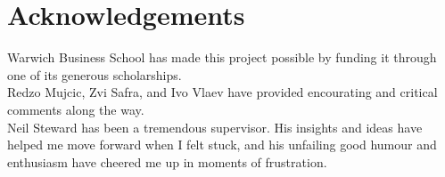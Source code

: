 
\chapter*{Acknowledgements}%
\label{cha:acknowledgements}

Warwich Business School has made this project possible by funding it through one of its generous scholarships.\\

\noindent Redzo Mujcic, Zvi Safra, and Ivo Vlaev have provided encourating and critical comments along the way.\\

\noindent Neil Steward has been a tremendous supervisor. His insights and ideas have
helped me move forward when I felt stuck, and his unfailing good humour and
enthusiasm have cheered me up in moments of frustration.
